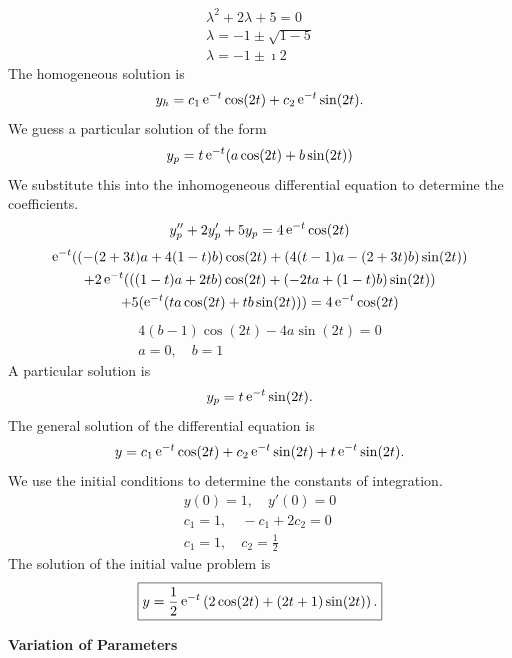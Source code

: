 {\begin{Solution}
\begin{enumerate}
    \begin{gather*}
      \lambda^2 + 2 \lambda + 5 = 0 \\
      \lambda = -1 \pm \sqrt{1 - 5} \\
      \lambda = -1 \pm \imath 2
    \end{gather*}
    The homogeneous solution is
    \[
    y_h = c_1 \mathop{\mathrm{e}}\nolimits^{-t} \cos(2 t) + c_2 \mathop{\mathrm{e}}\nolimits^{-t} \sin(2 t).
    \]
    We guess a particular solution of the form
    \[
    y_p = t \mathop{\mathrm{e}}\nolimits^{-t} (a \cos(2 t) + b \sin(2 t))
    \]
    We substitute this into the inhomogeneous differential equation to 
    determine the coefficients.
    \[
    y_p'' + 2 y_p' + 5 y_p = 4 \mathop{\mathrm{e}}\nolimits^{-t} \cos(2 t)
    \]
    \begin{multline*}
      \mathop{\mathrm{e}}\nolimits^{-t} ( ( - (2 + 3 t) a + 4 (1 - t) b ) \cos(2 t) 
      + ( 4 (t - 1) a - (2 + 3 t) b ) \sin(2 t) ) \\
      + 2 \mathop{\mathrm{e}}\nolimits^{-t} ( ( (1 - t) a + 2 t b ) \cos(2 t)
      + ( - 2 t a + (1 - t) b ) \sin(2 t) ) \\
      + 5 ( \mathop{\mathrm{e}}\nolimits^{-t} (t a \cos(2 t) + t b \sin(2 t)) ) = 4 \mathop{\mathrm{e}}\nolimits^{-t} \cos(2 t)
    \end{multline*}
    \begin{gather*}
      4 (b - 1) \cos(2 t) - 4 a \sin(2 t) = 0 \\
      a = 0, \quad b =  1
    \end{gather*}
    A particular solution is
    \[
    y_p = t \mathop{\mathrm{e}}\nolimits^{-t} \sin(2 t).
    \]
    The general solution of the differential equation is
    \[
    y = c_1 \mathop{\mathrm{e}}\nolimits^{-t} \cos(2 t) + c_2 \mathop{\mathrm{e}}\nolimits^{-t} \sin(2 t) + t \mathop{\mathrm{e}}\nolimits^{-t} \sin(2 t).
    \]
    We use the initial conditions to determine the constants of integration.
    \begin{gather*}
      y(0) = 1, \quad y'(0) = 0 \\
      c_1 = 1, \quad - c_1 + 2 c_2 = 0 \\
      c_1 = 1, \quad c_2 = \frac{1}{2}
    \end{gather*}
    The solution of the initial value problem is
    \[
    \boxed{
      y = \frac{1}{2} \mathop{\mathrm{e}}\nolimits^{-t} \left( 2 \cos(2 t) + (2 t + 1) \sin(2 t) \right).
      }
    \]
  \end{enumerate}
\end{Solution}






\begin{large}
  \noindent
  \textbf{Variation of Parameters}
\end{large}







}
